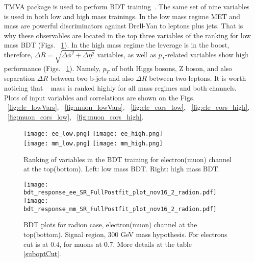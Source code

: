 TMVA package is used to perform BDT training~\cite{Hocker:2007ht}.
The same set of nine variables is used in both low and high mass
trainings.
In the low mass regime MET and \HBB~ mass are powerful discriminators against Drell-Yan to leptons plus jets. That is why these
observables are located in the top three variables of the ranking for low mass BDT (Figs. ~\ref{fig:ranking}). In the high mass regime the leverage is in the
boost, therefore, $\Delta R = \sqrt{\Delta \phi^2 + \Delta \eta^2}$ variables, as well as $p_{T}$-related variables show high
performance (Figs. ~\ref{fig:ranking}). Namely, $p_{T}$ of both Higgs bosons, Z boson, and also
separation $\Delta R $  between two b-jets and also $\Delta R $ between  two leptons.
It is worth noticing that \HBB~ mass is ranked highly for all mass regimes and both channels. Plots of input variables and correlations are shown on the Figs. ~\ref{fig:ele_lowVars}, ~\ref{fig:muon_lowVars}, ~\ref{fig:ele_cors_low}, ~\ref{fig:ele_cors_high}, ~\ref{fig:muon_cors_low}, ~\ref{fig:muon_cors_high}.

\begin{figure}[tbp]
  \begin{center}
   \texttt{[image: ee\_low.png]}
   \texttt{[image: ee\_high.png]}\\
   \texttt{[image: mm\_low.png]}
   \texttt{[image: mm\_high.png]}
    \caption{ Ranking of variables in the BDT training for electron(muon) channel at the top(bottom). Left: low mass BDT. Right: high mass BDT.}
    \label{fig:ranking}
  \end{center}
\end{figure}


\begin{figure}[tbp]
  \begin{center}
   \texttt{[image: bdt\_response\_ee\_SR\_FullPostfit\_plot\_nov16\_2\_radion.pdf]}\\
   \texttt{[image: bdt\_response\_mm\_SR\_FullPostfit\_plot\_nov16\_2\_radion.pdf]}\\
    \caption{ BDT plots for radion case, electron(muon) channel at the top(bottom). Signal region, 300 GeV mass hypothesis. For electrons cut is at 0.4, for muons at 0.7. More details at the table \ref{suboptCut}.}
    \label{fig:BDTs}
  \end{center}
\end{figure}





